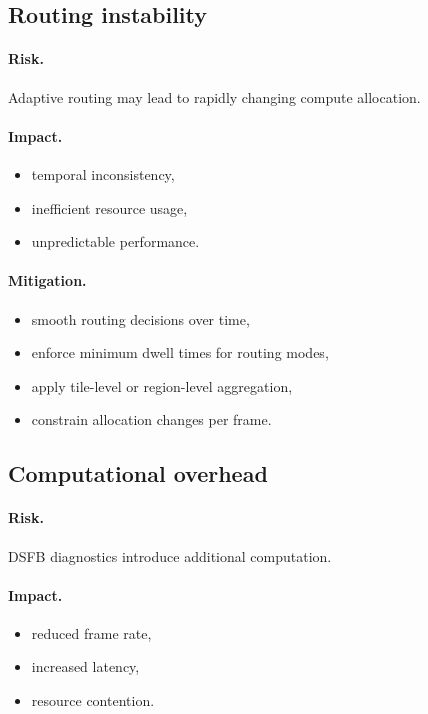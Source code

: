 \documentclass[11pt,letterpaper]{article}
\theoremstyle{gcresult}
\theoremstyle{definition}
\begin{document}

\subsection{Routing instability}

\paragraph{Risk.}
Adaptive routing may lead to rapidly changing compute allocation.

\paragraph{Impact.}
\begin{itemize}[leftmargin=1.5em]
    \item temporal inconsistency,
    \item inefficient resource usage,
    \item unpredictable performance.
\end{itemize}

\paragraph{Mitigation.}
\begin{itemize}[leftmargin=1.5em]
    \item smooth routing decisions over time,
    \item enforce minimum dwell times for routing modes,
    \item apply tile-level or region-level aggregation,
    \item constrain allocation changes per frame.
\end{itemize}


\subsection{Computational overhead}

\paragraph{Risk.}
DSFB diagnostics introduce additional computation.

\paragraph{Impact.}
\begin{itemize}[leftmargin=1.5em]
    \item reduced frame rate,
    \item increased latency,
    \item resource contention.
\end{itemize}
\end{document}
